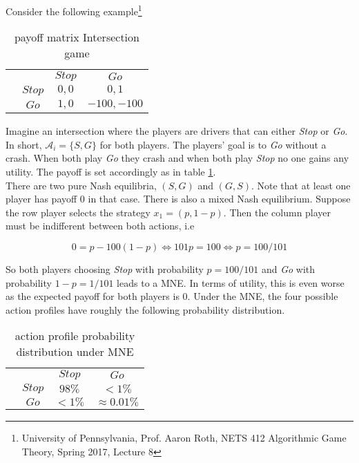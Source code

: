 Consider the following example\footnote{University of Pennsylvania, Prof. Aaron Roth, NETS 412 Algorithmic Game Theory, Spring 2017, Lecture 8}

\begin{table}[H]\centering
\setlength{\extrarowheight}{2pt}
\begin{tabular}{cc|c|c|}
  & \multicolumn{1}{c}{} & \multicolumn{1}{c}{$Stop$}  & \multicolumn{1}{c}{$Go$} \\\cline{3-4}
  & $Stop$ & $0,0$ & $0,1$ \\\cline{3-4}
  & $Go$ & $1,0$ & $-100,-100$ \\\cline{3-4}
\end{tabular}\caption{\label{tab:payoffIntersectionfromFiniteGames}payoff matrix Intersection game}
\end{table}

Imagine an intersection where the players are drivers that can either \textit{Stop} or \textit{Go}. In short, $\mathcal{A}_i = \{S,G\}$ for both players. The players' goal is to \textit{Go} without a crash. When both play \textit{Go} they crash and when both play \textit{Stop} no one gains any utility. The payoff is set accordingly as in table \ref{tab:payoffIntersectionfromFiniteGames}. \\

There are two pure Nash equilibria, $(S,G)$ and $(G,S)$. Note that at least one player has payoff $0$ in that case. There is also a mixed Nash equilibrium. Suppose the row player selects the strategy $x_1 = (p,1-p)$. Then the column player must be indifferent between both actions, i.e 

\begin{equation*}
    0 = p - 100(1-p) \iff 101p = 100 \iff p = 100/101
\end{equation*}

So both players choosing \textit{Stop} with probability $p = 100/101$ and \textit{Go} with probability $1-p = 1/101$  leads to a MNE. In terms of utility, this is even worse as the expected payoff for both players is $0$. Under the MNE, the four possible action profiles have roughly the following probability distribution. 

\begin{table}[H]\centering
\setlength{\extrarowheight}{2pt}
\begin{tabular}{cc|c|c|}
  & \multicolumn{1}{c}{} & \multicolumn{1}{c}{$Stop$}  & \multicolumn{1}{c}{$Go$} \\\cline{3-4}
  & $Stop$ & $98\%$ & $<1\%$ \\\cline{3-4}
  & $Go$ & $<1\%$ & $\approx 0.01\%$ \\\cline{3-4}
\end{tabular}\caption{\label{tab:probabilityUnderMNE}action profile probability distribution under MNE}
\end{table}

